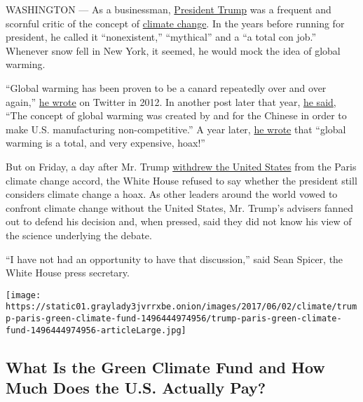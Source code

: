 WASHINGTON --- As a businessman,
\href{https://www.nytimes3xbfgragh.onion/topic/person/donald-trump?inline=nyt-per}{President
Trump} was a frequent and scornful critic of the concept of
\href{https://www.nytimes3xbfgragh.onion/section/climate?inline=nyt-classifier}{climate
change}. In the years before running for president, he called it
``nonexistent,'' ``mythical'' and a ``a total con job.'' Whenever snow
fell in New York, it seemed, he would mock the idea of global warming.

``Global warming has been proven to be a canard repeatedly over and over
again,''
\href{https://twitter.com/realDonaldTrump/status/185074709111644160?ref_src=twsrc\%5Etfw\&ref_url=https\%3A\%2F\%2Fwww.vox.com\%2Fpolicy-and-politics\%2F2017\%2F6\%2F1\%2F15726472\%2Ftrump-tweets-global-warming-paris-climate-agreement}{he
wrote} on Twitter in 2012. In another post later that year,
\href{https://twitter.com/realdonaldtrump/status/265895292191248385?lang=en}{he
said}, ``The concept of global warming was created by and for the
Chinese in order to make U.S. manufacturing non-competitive.'' A year
later,
\href{https://twitter.com/realDonaldTrump/status/408977616926830592?ref_src=twsrc\%5Etfw\&ref_url=https\%3A\%2F\%2Fwww.vox.com\%2Fpolicy-and-politics\%2F2017\%2F6\%2F1\%2F15726472\%2Ftrump-tweets-global-warming-paris-climate-agreement}{he
wrote} that ``global warming is a total, and very expensive, hoax!''

But on Friday, a day after Mr. Trump
\href{https://www.nytimes3xbfgragh.onion/2017/06/01/climate/trump-paris-climate-agreement.html?ref=todayspaper}{withdrew
the United States} from the Paris climate change accord, the White House
refused to say whether the president still considers climate change a
hoax. As other leaders around the world vowed to confront climate change
without the United States, Mr. Trump's advisers fanned out to defend his
decision and, when pressed, said they did not know his view of the
science underlying the debate.

``I have not had an opportunity to have that discussion,'' said Sean
Spicer, the White House press secretary.

\href{https://www.nytimes3xbfgragh.onion/interactive/2017/06/02/climate/trump-paris-green-climate-fund.html}{}

\texttt{[image: https://static01.graylady3jvrrxbe.onion/images/2017/06/02/climate/trump-paris-green-climate-fund-1496444974956/trump-paris-green-climate-fund-1496444974956-articleLarge.jpg]}

\hypertarget{what-is-the-green-climate-fund-and-how-much-does-the-us-actually-pay}{%
\subsection{What Is the Green Climate Fund and How Much Does the U.S.
Actually
Pay?}\label{what-is-the-green-climate-fund-and-how-much-does-the-us-actually-pay}}

